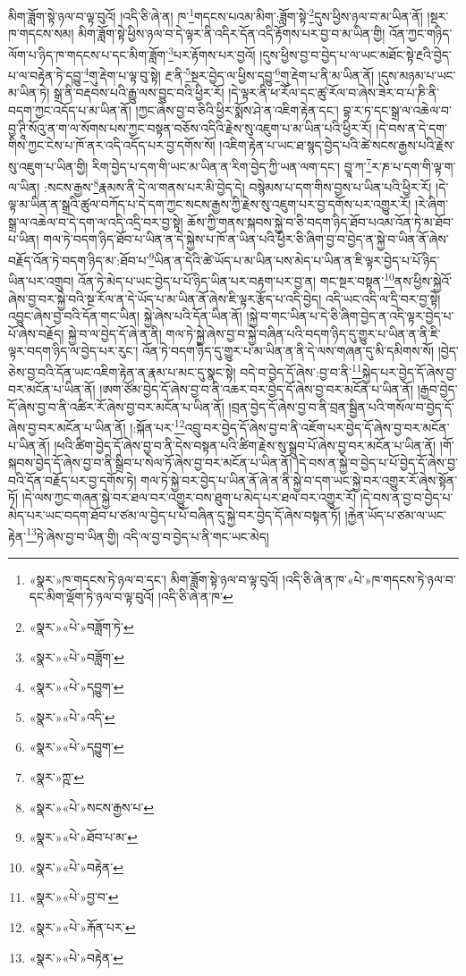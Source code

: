 མིག་ཟློག་སྟེ་ཉལ་བ་ལྟ་བུའོ། །འདི་ཅི་ཞེ་ན། ཁ་\footnote{«སྣར་»ཁ་གདངས་ཏེ་ཉལ་བ་དང་། མིག་ཟློག་སྟེ་ཉལ་བ་ལྟ་བུའོ། །འདི་ཅི་ཞེ་ན་ཁ་«པེ་»ཁ་གདངས་ཏེ་ཉལ་བ་དང་མིག་ལྡོག་ཏེ་ཉལ་བ་ལྟ་བུའོ། །འདི་ཅི་ཞེ་ན་ཁ་}གདངས་པའམ་མིག་:ཟློག་སྟེ་\footnote{«སྣར་»«པེ་»བཟློག་ཏེ་}དུས་ཕྱིས་ཉལ་བ་མ་ཡིན་ནོ། །སྔར་ཁ་གདངས་སམ། མིག་ཟློག་སྟེ་ཕྱིས་ཉལ་བ་དེ་ལྟར་ནི་འདིར་དོན་འདི་རྟོགས་པར་བྱ་བ་མ་ཡིན་གྱི། འོན་ཀྱང་གཉིད་ལོག་པ་ཉིད་ཁ་གདངས་པ་དང་མིག་ཟློག་\footnote{«སྣར་»«པེ་»བཟློག་}པར་རྟོགས་པར་བྱའོ། །དུས་ཕྱིས་བྱ་བ་བྱེད་པ་ལ་ཡང་མཐོང་སྟེ་རྔའི་བྱེད་པ་ལ་བརྟེན་ཏེ་དབྱུ་\footnote{«སྣར་»«པེ་»དབྱུག་}གུ་རྡེག་པ་ལྟ་བུ་སྟེ། རྔ་ནི་\footnote{«སྣར་»«པེ་»འདི་}སྔར་བྱེད་ལ་ཕྱིས་དབྱུ་\footnote{«སྣར་»«པེ་»དབྱུག་}གུ་རྡེག་པ་ནི་མ་ཡིན་ནོ། །དུས་མཉམ་པ་ཡང་མ་ཡིན་ཏེ། སྒྲ་ནི་བརྡབས་པའི་རྒྱུ་ལས་བྱུང་བའི་ཕྱིར་རོ། །དེ་ལྟར་ནི་ཕ་རོལ་དང་ཚུ་རོལ་བ་ཞེས་ཟེར་བ་པ་ཎི་ནི་བདག་ཀྱང་འདོད་པ་མ་ཡིན་ནོ། །ཀྱང་ཞེས་བྱ་བ་ཅིའི་ཕྱིར་སྨོས་ཤེ་ན་འཇིག་རྟེན་དང་། བྷ་ར་ཏ་དང་སྒྲ་ལ་འཆེལ་བ་བྱ་ཊཱི་སོའུ་ན་ག་ལ་སོགས་པས་ཀྱང་བསྟན་བཅོས་འདིའི་རྗེས་སུ་འཇུག་པ་མ་ཡིན་པའི་ཕྱིར་རོ། །དེ་བས་ན་དེ་དག་གིས་ཀྱང་ངེས་པ་ཁོ་ནར་འདི་འདོད་པར་བྱ་དགོས་སོ། །འཇིག་རྟེན་པ་ཡང་ཐ་སྙད་བྱེད་པའི་ཚེ་སངས་རྒྱས་པའི་རྗེས་སུ་འཇུག་པ་ཡིན་གྱི། རིག་བྱེད་པ་དག་གི་ཡང་མ་ཡིན་ན་རིག་བྱེད་ཀྱི་ཡན་ལག་དང་། བྱཱ་ཀ་\footnote{«སྣར་»ཀྵ་}ར་ཎ་པ་དག་གི་ལྟ་ག་ལ་ཡིན། :སངས་རྒྱས་\footnote{«སྣར་»«པེ་»སངས་རྒྱས་པ་}རྣམས་ནི་དེ་ལ་གནས་པར་མི་བྱེད་དེ། བསྙེམས་པ་དག་གིས་བྱས་པ་ཡིན་པའི་ཕྱིར་རོ། །དེ་ལྟ་མ་ཡིན་ན་སྒྲའི་ཚུལ་བཀོད་པ་དེ་དག་ཀྱང་སངས་རྒྱས་ཀྱི་རྗེས་སུ་འཇུག་པར་བྱ་དགོས་པར་འགྱུར་རོ། །རེ་ཞིག་སྒྲ་ལ་འཆེལ་བ་དེ་དག་ལ་འདི་འདྲི་བར་བྱ་སྟེ། ཆོས་ཀྱི་གནས་སྐབས་སྐྱེ་བ་ཅི་བདག་ཉིད་ཐོབ་པའམ་འོན་ཏེ་མ་ཐོབ་པ་ཡིན། གལ་ཏེ་བདག་ཉིད་ཐོབ་པ་ཡིན་ན་དེ་སྐྱེས་པ་ཁོ་ན་ཡིན་པའི་ཕྱིར་ཅི་ཞིག་བྱ་བ་བྱེད་ན་སྐྱེ་བ་ཡིན་ནོ་ཞེས་བརྗོད་འོན་ཏེ་བདག་ཉིད་མ་:ཐོབ་པ་\footnote{«སྣར་»«པེ་»ཐོབ་པ་མ་}ཡིན་ན་དེའི་ཚེ་ཡོད་པ་མ་ཡིན་པས་མེད་པ་ཡིན་ན་ཇི་ལྟར་བྱེད་པ་པོ་ཉིད་ཡིན་པར་འགྲུབ། འོན་ཏེ་མེད་པ་ཡང་བྱེད་པ་པོ་ཉིད་ཡིན་པར་བརྟག་པར་བྱ་ན། གང་སྔར་བསྟན་\footnote{«སྣར་»«པེ་»བརྟེན་}ནས་ཕྱིས་སྐྱེའོ་ཞེས་བྱ་བར་སྐྱེ་བའི་སྔ་རོལ་ན་དེ་ཡོད་པ་མ་ཡིན་ནོ་ཞེས་ཇི་ལྟར་རྩོད་པ་འདི་བྱེད། འདི་ཡང་འདི་ལ་དྲི་བར་བྱ་སྟེ། འབྱུང་ཞེས་བྱ་བའི་དོན་གང་ཡིན། སྐྱེ་ཞེས་པའི་དོན་ཡིན་ནོ། །སྐྱེ་བ་གང་ཡིན་པ་དེ་ཅི་ཞིག་བྱེད་ན་འདི་ལྟར་བྱེད་པ་པོ་ཞེས་བརྗོད། སྐྱེ་བ་ལ་བྱེད་དོ་ཞེ་ན་ནི། གལ་ཏེ་སྐྱེ་ཞེས་བྱ་བ་སྐྱེ་བཞིན་པའི་བདག་ཉིད་དུ་གྱུར་པ་ཡིན་ན་ནི་ཇི་ལྟར་བདག་ཉིད་ལ་བྱེད་པར་རུང་། འོན་ཏེ་བདག་ཉིད་དུ་གྱུར་པ་མ་ཡིན་ན་ནི་དེ་ལས་གཞན་དུ་མི་དམིགས་སོ། །བྱེད་ཅེས་བྱ་བའི་དོན་ཡང་འཇིག་རྟེན་ན་རྣམ་པ་མང་དུ་སྣང་སྟེ། བདེ་བ་བྱེད་དོ་ཞེས་:བྱ་བ་ནི་\footnote{«སྣར་»«པེ་»བྱ་བ་}སྐྱེད་པར་བྱེད་དོ་ཞེས་བྱ་བར་མངོན་པ་ཡིན་ནོ། །ཨག་ཙོམ་བྱེད་དོ་ཞེས་བྱ་བ་ནི་འཆར་བར་བྱེད་དོ་ཞེས་བྱ་བར་མངོན་པ་ཡིན་ནོ། །རྒྱབ་བྱེད་དོ་ཞེས་བྱ་བ་ནི་འཚིར་རོ་ཞེས་བྱ་བར་མངོན་པ་ཡིན་ནོ། །བྲན་བྱེད་དོ་ཞེས་བྱ་བ་ནི་བྲན་སྦྱིན་པའི་གསོལ་བ་བྱེད་དོ་ཞེས་བྱ་བར་མངོན་པ་ཡིན་ནོ། །:སྐོན་པར་\footnote{«སྣར་»«པེ་»རྐོན་པར་}འབྲུ་བར་བྱེད་དོ་ཞེས་བྱ་བ་ནི་འཇོག་པར་བྱེད་དོ་ཞེས་བྱ་བར་མངོན་པ་ཡིན་ནོ། །ཕའི་ཚིག་བྱེད་དོ་ཞེས་བྱ་བ་ནི་དེས་བསྟན་པའི་ཚིག་རྗེས་སུ་སྒྲུབ་པོ་ཞེས་བྱ་བར་མངོན་པ་ཡིན་ནོ། །གོ་སྐབས་བྱེད་དོ་ཞེས་བྱ་བ་ནི་སྒྲིབ་པ་སེལ་ཏོ་ཞེས་བྱ་བར་མངོན་པ་ཡིན་ནོ། །དེ་བས་ན་སྐྱེ་བ་བྱེད་པ་པོ་བྱེད་དོ་ཞེས་བྱ་བའི་དོན་བརྗོད་པར་བྱ་དགོས་ཏེ། གལ་ཏེ་སྐྱེ་བར་བྱེད་པ་ཡིན་ནོ་ཞེ་ན་ནི་སྐྱེ་བ་དག་ཡང་སྐྱེ་བར་འགྱུར་རོ་ཞེས་སྟོན་ཏོ། །དེ་ལས་ཀྱང་གཞན་སྐྱེ་བར་ཐལ་བར་འགྱུར་བས་ཐུག་པ་མེད་པར་ཐལ་བར་འགྱུར་རོ། །དེ་བས་ན་བྱ་བ་བྱེད་པ་མེད་པར་ཡང་བདག་ཐོབ་པ་ཙམ་ལ་བྱེད་པ་པོ་བཞིན་དུ་སྐྱེ་བར་བྱེད་དོ་ཞེས་བསྟན་ཏོ། །རྐྱེན་ཡོད་པ་ཙམ་ལ་ཡང་རྟེན་\footnote{«སྣར་»«པེ་»བརྟེན་}ཏེ་ཞེས་བྱ་བ་ཡིན་གྱི། འདི་ལ་བྱ་བ་བྱེད་པ་ནི་གང་ཡང་མེད། 